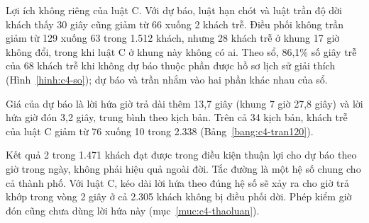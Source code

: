 Lợi ích không riêng của luật C. Với dự báo, luật hạn chót và luật trần độ dời khách thấy 30 giây cũng giảm từ 66 xuống
2 khách trễ. Điều phối không trần giảm từ 129 xuống 63 trong 1.512 khách, nhưng 28 khách trễ ở khung 17 giờ không đổi,
trong khi luật C ở khung này không có ai. Theo sổ, 86,1\% số giây trễ của 68 khách trễ khi không dự báo thuộc phần được
hồ sơ lịch sử giải thích (Hình~\ref{hinh:c4-so}); dự báo và trần nhắm vào hai phần khác nhau của sổ.

Giá của dự báo là lời hứa giờ trả dài thêm 13,7 giây (khung 7 giờ 27,8 giây) và lời hứa giờ đón 3,2 giây, trung bình
theo kịch bản. Trên cả 34 kịch bản, khách trễ của luật C giảm từ 76 xuống 10 trong 2.338 (Bảng~\ref{bang:c4-tran120}).

Kết quả 2 trong 1.471 khách đạt được trong điều kiện thuận lợi cho dự báo theo giờ trong ngày, không phải hiệu quả ngoài
đời. Tắc đường là một hệ số chung cho cả thành phố. Với luật C, kéo dài lời hứa theo đúng hệ số sẽ xảy ra cho giờ trả khớp trong vòng 2 giây ở cả 2.305 khách
không bị điều phối dời. Phép kiểm giờ đón cũng chưa dùng lời hứa này (mục~\ref{muc:c4-thaoluan}).

